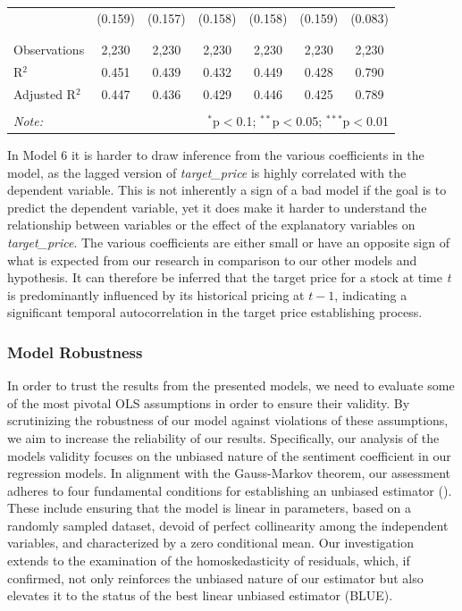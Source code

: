 \begin{table}[H]
{\begin{tabular}{@{\extracolsep{5pt}}lcccccc}
  & (0.159) & (0.157) & (0.158) & (0.158) & (0.159) & (0.083) \\ 
  & & & & & & \\ 
\hline \\[-1.8ex] 
Observations & 2,230 & 2,230 & 2,230 & 2,230 & 2,230 & 2,230 \\ 
R$^{2}$ & 0.451 & 0.439 & 0.432 & 0.449 & 0.428 & 0.790 \\ 
Adjusted R$^{2}$ & 0.447 & 0.436 & 0.429 & 0.446 & 0.425 & 0.789 \\ 
\hline 
\hline \\[-1.8ex] 
\textit{Note:}  & \multicolumn{6}{r}{$^{*}$p$<$0.1; $^{**}$p$<$0.05; $^{***}$p$<$0.01} \\ 
\end{tabular}  
  }
\end{table}

\clearpage


In Model 6 it is harder to draw inference from the various coefficients in the model, as the lagged version of \textit{target\_price} is highly correlated with the dependent variable. This is not inherently a sign of a bad model if the goal is to predict the dependent variable, yet it does make it harder to understand the relationship between variables or the effect of the explanatory variables on \textit{target\_price}. The various coefficients are either small or have an opposite sign of what is expected from our research in comparison to our other models and hypothesis. It can therefore be inferred that the target price for a stock at time \textit{t} is predominantly influenced by its historical pricing at \(t-1\), indicating a significant temporal autocorrelation in the target price establishing process.



\subsubsection{Model Robustness}
In order to trust the results from the presented models, we need to evaluate some of the most pivotal OLS assumptions in order to ensure their validity. By scrutinizing the robustness of our model against violations of these assumptions, we aim to increase the reliability of our results. Specifically, our analysis of the models validity focuses on the unbiased nature of the sentiment coefficient in our regression models. In alignment with the Gauss-Markov theorem, our assessment adheres to four fundamental conditions for establishing an unbiased estimator (\cite{book:econometricswatson}). These include ensuring that the model is linear in parameters, based on a randomly sampled dataset, devoid of perfect collinearity among the independent variables, and characterized by a zero conditional mean. Our investigation extends to the examination of the homoskedasticity of residuals, which, if confirmed, not only reinforces the unbiased nature of our estimator but also elevates it to the status of the best linear unbiased estimator (BLUE).

